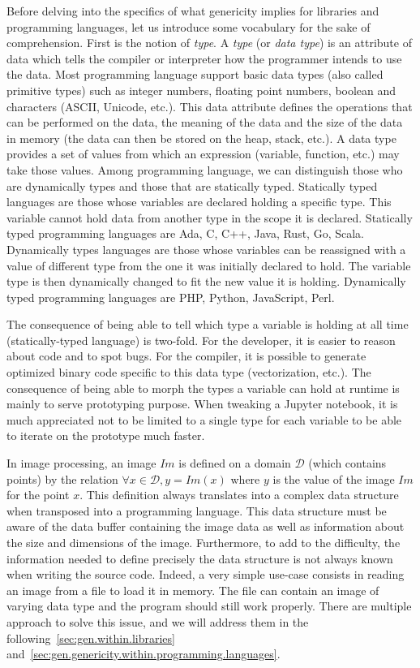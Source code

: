 Before delving into the specifics of what genericity implies for libraries and programming languages, let us introduce
some vocabulary for the sake of comprehension. First is the notion of \emph{type}. A \emph{type} (or \emph{data type})
is an attribute of data which tells the compiler or interpreter how the programmer intends to use the data. Most
programming language support basic data types (also called primitive types) such as integer numbers, floating point
numbers, boolean and characters (ASCII, Unicode, etc.). This data attribute defines the operations that can be performed
on the data, the meaning of the data and the size of the data in memory (the data can then be stored on the heap, stack,
etc.). A data type provides a set of values from which an expression (\ie variable, function, etc.) may take those
values. Among programming language, we can distinguish those who are dynamically types and those that are statically
typed. Statically typed languages are those whose variables are declared holding a specific type. This variable cannot
hold data from another type in the scope it is declared. Statically typed programming languages are Ada, C, C++, Java,
Rust, Go, Scala. Dynamically types languages are those whose variables can be reassigned with a value of different type
from the one it was initially declared to hold. The variable type is then dynamically changed to fit the new value it is
holding. Dynamically typed programming languages are PHP, Python, JavaScript, Perl.

The consequence of being able to tell which type a variable is holding at all time (statically-typed language) is
two-fold. For the developer, it is easier to reason about code and to spot bugs. For the compiler, it is possible to
generate optimized binary code specific to this data type (vectorization, etc.). The consequence of being able to morph
the types a variable can hold at runtime is mainly to serve prototyping purpose. When tweaking a Jupyter notebook, it is
much appreciated not to be limited to a single type for each variable to be able to iterate on the prototype much
faster.

In image processing, an image \(Im\) is defined on a domain \(\mathcal{D}\) (which contains points) by the relation
\(\forall x \in \mathcal{D}, y = Im(x)\) where \(y\) is the value of the image \(Im\) for the point \(x\). This
definition always translates into a complex data structure when transposed into a programming language. This data
structure must be aware of the data buffer containing the image data as well as information about the size and
dimensions of the image. Furthermore, to add to the difficulty, the information needed to define precisely the data
structure is not always known when writing the source code. Indeed, a very simple use-case consists in reading an image
from a file to load it in memory. The file can contain an image of varying data type and the program should still work
properly. There are multiple approach to solve this issue, and we will address them in the
following~\cref{sec:gen.within.libraries} and~\cref{sec:gen.genericity.within.programming.languages}.




